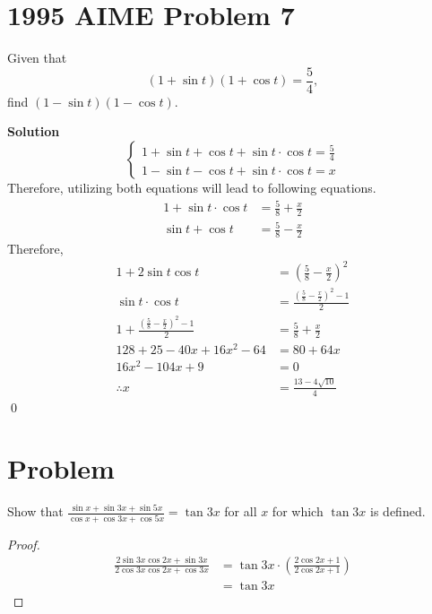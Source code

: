 \documentclass{article}
\newenvironment{solution}{\begin{trivlist}\item[]{\bf Solution}}{\qed \end{trivlist}}
\begin{document}
\section*{1995 AIME Problem 7}
Given that
\[
(1 + \sin t)(1 + \cos t) = \frac{5}{4},
\]
find $(1 - \sin t)(1 - \cos t)$.
\begin{solution}
\[
\begin{cases}
    1 + \sin t + \cos t + \sin t \cdot \cos t = \frac{5}{4} \\
    1 - \sin t - \cos t + \sin t \cdot \cos t = x
\end{cases}
\]
Therefore, utilizing both equations will lead to following equations.
\begin{align*}
    1 + \sin t \cdot \cos t &= \frac{5}{8} + \frac{x}{2} \\
    \sin t + \cos t &= \frac{5}{8} - \frac{x}{2}
\end{align*}
Therefore,
\begin{align*}
    1 + 2 \sin t \cos t &= \left( \frac{5}{8} - \frac{x}{2} \right)^2 \\
    \sin t \cdot \cos t &= \frac{\left( \frac{5}{8} - \frac{x}{2} \right)^2 - 1}{2} \\
    1 + \frac{\left( \frac{5}{8} - \frac{x}{2} \right)^2 - 1}{2} &= \frac{5}{8} + \frac{x}{2} \\
    128 + 25 - 40x + 16x^2 - 64 &= 80 + 64x \\
    16x^2 -104x + 9 &= 0 \\
    \therefore x &= \boxed{\frac{13 - 4\sqrt{10}}{4}}
\end{align*}
\end{solution}

\section*{Problem}
Show that $\frac{\sin x + \sin 3x + \sin 5x}{\cos x + \cos 3x + \cos 5x} = \tan 3x$ for all $x$ for which $\tan 3x$ is defined.
\begin{proof}
\begin{align*}
    \frac{2 \sin 3x \cos 2x + \sin 3x}{2 \cos 3x \cos 2x + \cos 3x}
    &= \tan 3x \cdot \left( \frac{2 \cos 2x + 1}{2 \cos 2x + 1} \right) \\
    &= \tan 3x
\end{align*}
\end{proof}
\end{document}
